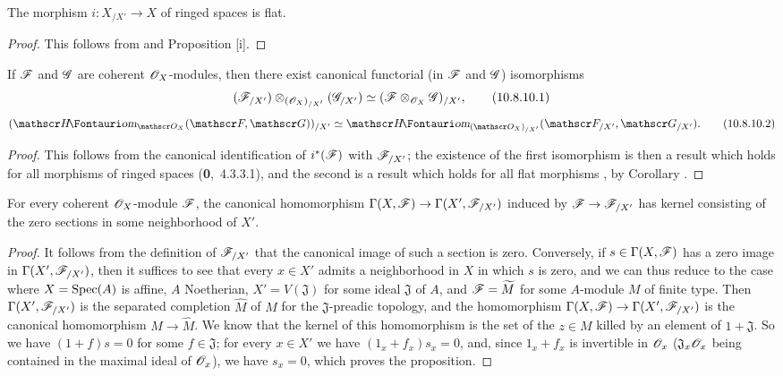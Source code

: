 \begin{corollary}[10.8.9]
\label{1.10.8.9}
The morphism $i:X_{/X'}\to X$ of ringed spaces is flat.
\end{corollary}

\begin{proof}
\label{proof-1.10.8.9}
This follows from  and Proposition [i].
\end{proof}

\begin{corollary}[10.8.10]
\label{1.10.8.10}
If $\mathscr{F}$ and $\mathscr{G}$ are coherent $\mathscr{O}_X$-modules, then there exist canonical functorial (in $\mathscr{F}$ and $\mathscr{G}$) isomorphisms
\[
\label{1.10.8.10.1}
  (\mathscr{F}_{/X'})\otimes_{(\mathscr{O}_X)_{/X'}}(\mathscr{G}_{/X'})\simeq(\mathscr{F}\otimes_{\mathscr{O}_X}\mathscr{G})_{/X'},
  \tag{10.8.10.1}
\]
\[
\label{1.10.8.10.2}
  (\shHom_{\sh{O}_X}(\sh{F},\sh{G}))_{/X'}\isoto\shHom_{(\sh{O}_X)_{/X'}}(\sh{F}_{/X'},\sh{G}_{/X'}).
  \tag{10.8.10.2}
\]
\end{corollary}

\begin{proof}
\label{proof-1.10.8.10}
This follows from the canonical identification of $i^*(\mathscr{F})$ with $\mathscr{F}_{/X'}$; the existence of the first isomorphism is then a result which holds for all morphisms of ringed spaces (\textbf{0},~4.3.3.1), and the second is a result which holds for all flat morphisms , by Corollary .
\end{proof}

\begin{proposition}[10.8.11]
\label{1.10.8.11}
For every coherent $\mathscr{O}_X$-module $\mathscr{F}$, the canonical homomorphism $\Gamma(X,\sh{F})\to\Gamma(X',\sh{F}_{/X'})$ induced by $\sh{F}\to\sh{F}_{/X'}$ has kernel consisting of the zero sections in some neighborhood of $X'$.
\end{proposition}

\begin{proof}
\label{proof-1.10.8.11}
It follows from the definition of $\mathscr{F}_{/X'}$ that the canonical image of such a section is zero.
Conversely, if $s\in\Gamma(X,\mathscr{F})$ has a zero image in $\Gamma(X',\mathscr{F}_{/X'})$, then it suffices to see that every $x\in X'$ admits a neighborhood in $X$ in which $s$ is zero, and we can thus reduce to the case where $X=\operatorname{Spec}(A)$ is affine, $A$ Noetherian, $X'=V(\mathfrak{J})$ for some ideal $\mathfrak{J}$ of $A$, and $\mathscr{F}=\widetilde{M}$ for some $A$-module $M$ of finite type.
Then $\Gamma(X',\mathscr{F}_{/X'})$ is the separated completion $\widehat{M}$ of $M$ for the $\mathfrak{J}$-preadic topology, and the homomorphism $\Gamma(X,\sh{F})\to\Gamma(X',\sh{F}_{/X'})$ is the canonical homomorphism $M\to\widehat{M}$.
We know  that the kernel of this homomorphism is the set of the $z\in M$ killed by an element of $1+\mathfrak{J}$.
So we have $(1+f)s=0$ for some $f\in\mathfrak{J}$; for every $x\in X'$ we have $(1_x+f_x)s_x=0$, and, since $1_x+f_x$ is invertible in $\mathscr{O}_x$ ($\mathfrak{J}_x\mathscr{O}_x$ being contained in the maximal ideal of $\mathscr{O}_x$), we have $s_x=0$, which proves the proposition.
\end{proof}

